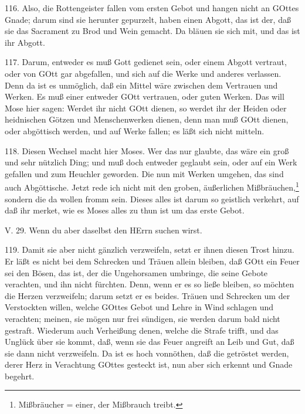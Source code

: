 116. Also, die Rottengeister fallen vom ersten Gebot und hangen nicht an GOttes Gnade; darum sind sie herunter gepurzelt, haben einen Abgott, das ist der, daß sie das Sacrament zu Brod und Wein gemacht. Da bläuen sie sich mit, und das ist ihr Abgott.

117. Darum, entweder es muß Gott gedienet sein, oder einem Abgott vertraut, oder von GOtt gar abgefallen, und sich auf die Werke und anderes verlassen. Denn da ist es unmöglich, daß ein Mittel wäre zwischen dem Vertrauen und Werken. Es muß einer entweder GOtt vertrauen, oder guten Werken. Das will Mose hier sagen: Werdet ihr nicht GOtt dienen, so werdet ihr der Heiden oder heidnischen Götzen und Menschenwerken dienen, denn man muß GOtt dienen, oder abgöttisch werden, und auf Werke fallen; es läßt sich nicht mitteln.

118. Diesen Wechsel macht hier Moses. Wer das nur glaubte, das wäre ein groß und sehr nützlich Ding; und muß doch entweder geglaubt sein, oder auf ein Werk gefallen und zum Heuchler geworden. Die nun mit Werken umgehen, das sind auch Abgöttische. Jetzt rede ich nicht mit den groben, äußerlichen Mißbräuchen,\footnote{Mißbräucher = einer, der Mißbrauch treibt.} sondern die da wollen fromm sein. Dieses alles ist darum so geistlich verkehrt, auf daß ihr merket, wie es Moses alles zu thun ist um das erste Gebot.

\begin{schriftzitat}
V. 29. Wenn du aber daselbst den HErrn suchen wirst.
\end{schriftzitat}

119. Damit sie aber nicht gänzlich verzweifeln, setzt er ihnen diesen Trost hinzu. Er läßt es nicht bei dem Schrecken und Träuen allein bleiben, daß GOtt ein Feuer sei den Bösen, das ist, der die Ungehorsamen umbringe, die seine Gebote verachten, und ihn nicht fürchten. Denn, wenn er es so ließe bleiben, so möchten die Herzen verzweifeln; darum setzt er es beides. Träuen und Schrecken um der Verstockten willen, welche GOttes Gebot und Lehre in Wind schlagen und verachten; meinen, sie mögen nur frei sündigen, sie werden darum bald nicht gestraft. Wiederum
auch Verheißung denen, welche die Strafe trifft, und das Unglück über sie kommt, daß, wenn sie das Feuer angreift an Leib und Gut, daß sie dann nicht verzweifeln. Da ist es hoch vonnöthen, daß die getröstet werden, derer Herz in Verachtung GOttes gesteckt ist, nun aber sich erkennt und Gnade begehrt.

